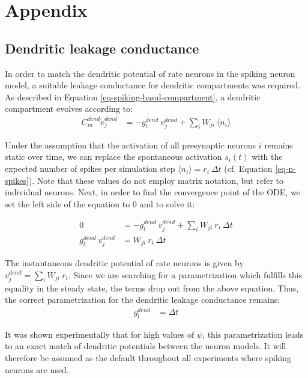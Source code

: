 
\chapter{Appendix}

\section{Dendritic leakage conductance}\label{sec-gl-dend}

In order to match the dendritic potential of rate neurons  in the spiking neuron model, a suitable leakage conductance
for dendritic compartments was required. As described in Equation \ref{eq-spiking-basal-compartment}, a dendritic
compartment evolves according to:
\begin{align}
  C_m^{dend} \dot{v}_j^{dend} & = -g_l^{dend} \  v_j^{dend} + \sum_i W_{ji} \    \langle \textit{n}_i \rangle
\end{align}

Under the assumption that the activation of all presynaptic neurons $i$ remains static over time, we can replace the
spontaneous activation $s_i(t)$ with the expected number of spikes per simulation step $\langle \textit{n}_i \rangle =
r_i \ \Delta t$ (cf. Equation \ref{eq-n-spikes}). Note that these values do not employ matrix notation, but refer to
individual neurons. Next, in order to find the convergence point of the ODE, we set the left side of the equation to $0$
and to solve it:

\begin{align}
  0                        & = -g_l^{dend} \  v_j^{dend} + \sum_i W_{ji} \    r_i \ \Delta t \\
  g_l^{dend} \  v_j^{dend} & = W_{ji} \    r_i \ \Delta t
\end{align}

The instantaneous dendritic potential of rate neurons is given by $v_j^{dend} = \sum_i W_{ji} \ r_i$. Since we are
searching for a parametrization which fulfills this equality in the steady state, the terms drop out from the above
equation. Thus, the correct parametrization for the dendritic leakage conductance remains:
\begin{align}
  g_l^{dend} & = \Delta t
\end{align}

It was shown experimentally that for high values of $\psi$, this parametrization leads to an exact match of dendritic
potentials between the neuron models. It will therefore be assumed as the default throughout all experiments where
spiking neurons are used. \newline

